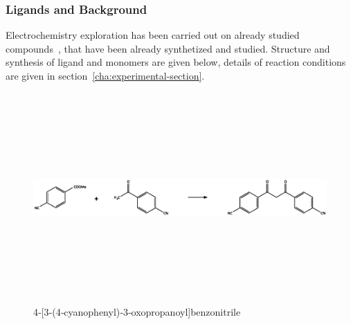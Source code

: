 \documentclass[../Master.tex]{subfiles}
\begin{document}
\subsubsection{Ligands and  Background}
Electrochemistry exploration has been carried out on already studied compounds\ \cite{carlucci_heterometallic_2010}, that have been already synthetized and studied. Structure and synthesis of ligand and monomers  are given below, details of reaction conditions are given in section\ \ref{cha:experimental-section}.
\begin{figure}[h!]
	\centering
	\includegraphics[width=16cm,height=8cm,keepaspectratio]{Structures/dicn-sint.eps}\caption{ 4‐[3‐(4‐cyanophenyl)‐3‐oxopropanoyl]benzonitrile}
\end{figure}
\end{document}
